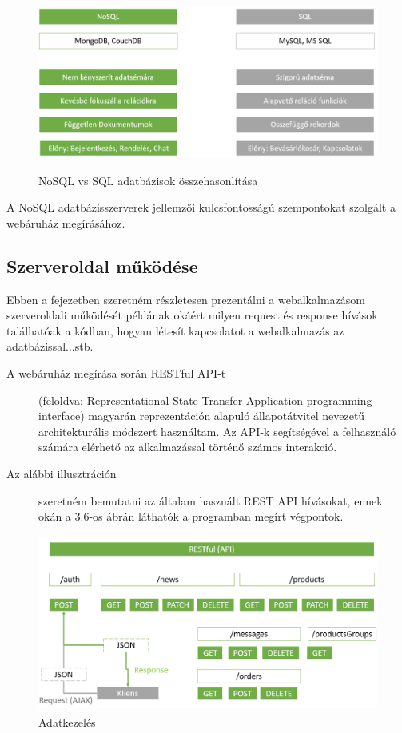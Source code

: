 \begin{figure}[H]
	\centering
	\includegraphics[width=1.0\textwidth,height=220px]{images/nosql_bemutatasa.png}
	\caption{NoSQL vs SQL adatbázisok összehasonlítása}
	\label{fig.picture-6}
\end{figure}

A NoSQL adatbázisszerverek jellemzői kulcsfontosságú szempontokat szolgált a webáruház megírásához.

\subsection{Szerveroldal működése}

Ebben a fejezetben szeretném részletesen prezentálni a webalkalmazásom szerveroldali működését példának okáért milyen request és response hívások találhatóak a kódban, hogyan létesít kapcsolatot a webalkalmazás az adatbázissal...stb.

\begin{description}
	\item[A webáruház megírása során RESTful API-t] (feloldva: Representational State Transfer Application programming interface) magyarán reprezentáción alapuló állapotátvitel nevezetű architekturális módszert használtam. Az API-k segítségével a felhasználó számára elérhető az alkalmazással történő számos interakció.
	
	\item[Az alábbi illusztráción] szeretném bemutatni az általam használt REST API hívásokat, ennek okán a 3.6-os ábrán láthatók a programban megírt végpontok.
\end{description}

\begin{figure}[H]
	\centering
	\includegraphics[width=1.0\textwidth,height=220px]{images/restapi_bemutatasa.png}
	\caption{Adatkezelés}
	\label{fig.picture-8}
\end{figure}

